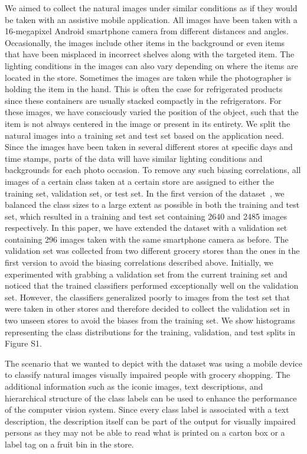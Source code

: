We aimed to collect the natural images under similar conditions as if they would be taken with an assistive mobile application. 
All images have been taken with a 16-megapixel Android smartphone camera from different distances and angles. 
Occasionally, the images include other items in the background or even items that have been misplaced in incorrect shelves along with the targeted item.
The lighting conditions in the images can also vary depending on where the items are located in the store. Sometimes the images are taken while the photographer is holding the item in the hand. This is often the case for refrigerated products since these containers are usually stacked compactly in the refrigerators. For these images, we have consciously varied the position of the object, such that the item is not always centered in the image or present in its entirety. We split the natural images into a training set and test set based on the application need. Since the images have been taken in several different stores at specific days and time stamps, parts of the data will have similar lighting conditions and backgrounds for each photo occasion. To remove any such biasing correlations, all images of a certain class taken at a certain store are assigned to either the training set, validation set, or test set. In the first version of the dataset~, we balanced the class sizes to a large extent as possible in both the training and test set, which resulted in a training and test set containing 2640 and 2485 images respectively. In this paper, we have extended the dataset with a validation set containing 296 images taken with the same smartphone camera as before. The validation set was collected from two different grocery stores than the ones in the first version to avoid the biasing correlations described above. 
Initially, we experimented with grabbing a validation set from the current training set and noticed that the trained classifiers performed exceptionally well on the validation set. However, the classifiers generalized poorly to images from the test set that were taken in other stores and therefore decided to collect the validation set in two unseen stores to avoid the biases from the training set. We show histograms representing the class distributions for the training, validation, and test splits in Figure S1.

The scenario that we wanted to depict with the dataset was using a mobile device to classify natural images visually impaired people with grocery shopping. The additional information such as the iconic images, text descriptions, and hierarchical structure of the class labels can be used to enhance the performance of the computer vision system. Since every class label is associated with a text description, the description itself can be part of the output for visually impaired persons as they may not be able to read what is printed on a carton box or a label tag on a fruit bin in the store. 

